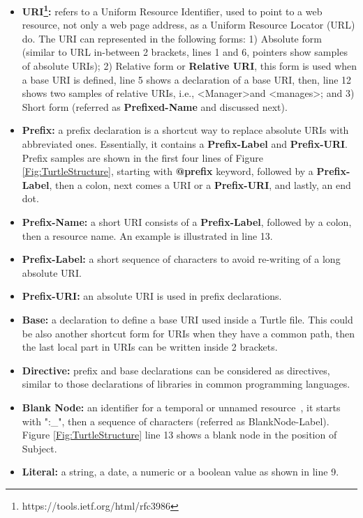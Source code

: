 \begin{itemize}
    \item \textbf{URI\footnote{https://tools.ietf.org/html/rfc3986
}:} refers to a Uniform Resource Identifier, used to point to a web resource, not only a web page address, as a Uniform Resource Locator (URL) do. 
The URI can represented in the following forms: 1) Absolute form (similar to URL in-between 2 brackets, lines 1 and 6, pointers show samples of absolute URIs); 
2) Relative form or \textbf{Relative URI}, this form is used when a base URI is defined, line 5 shows a declaration of a base URI, then, line 12 shows two samples of relative URIs, i.e., \textless Manager\textgreater and \textless manages\textgreater; and 
3) Short form (referred as \textbf{Prefixed-Name} and discussed next).
  \item \textbf{Prefix:} a prefix declaration is a shortcut way to replace absolute URIs with abbreviated ones. Essentially, it contains a \textbf{Prefix-Label} and \textbf{Prefix-URI}. 
  Prefix samples are shown in the first four lines of Figure \ref{Fig:TurtleStructure}, starting with \textbf{@prefix} keyword, followed by a \textbf{Prefix-Label}, then a colon, next comes a URI or a \textbf{Prefix-URI}, and lastly, an end dot. 
 \item \textbf{Prefix-Name:} a short URI consists of a \textbf{Prefix-Label}, followed by a colon, then a resource name. An example is illustrated in line 13.
        
  \item \textbf{Prefix-Label:} a short sequence of characters to avoid re-writing of a long absolute URI.
  \item \textbf{Prefix-URI:} an absolute URI is used in prefix declarations. 
  \item \textbf{Base:} a declaration to define a base URI used inside a Turtle file. 
  This could be also another shortcut form for URIs when they have a common path, then the last local part in URIs can be written inside 2 brackets. 
        
\item \textbf{Directive:} prefix and base declarations can be considered as directives, similar to those declarations of libraries in common programming languages.  
    \item \textbf{Blank Node:} an identifier for a temporal or unnamed resource~\cite{journals:tkde:GutierrezHV07}, it starts with ":\_", then a sequence of characters (referred as BlankNode-Label). 
    Figure \ref{Fig:TurtleStructure} line 13 shows a blank node in the position of Subject.  
    \item \textbf{Literal:} a string, a date, a numeric or a boolean value as shown in line 9.
\end{itemize} 

